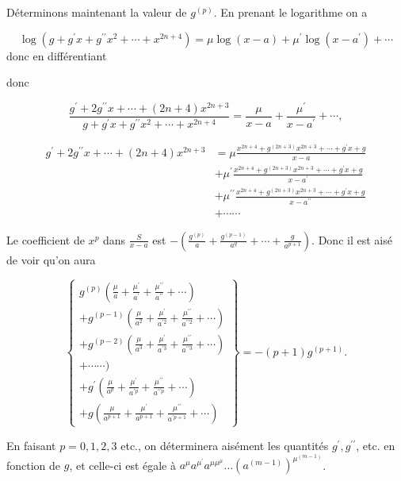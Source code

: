 \documentclass{article}
\begin{document}
Déterminons maintenant la valeur de \(g^{(p)}\). En prenant le logarithme on a

\[
\log \left(g+g^{\prime} x+g^{\prime \prime} x^{2}+\cdots+x^{2 n+4}\right)=\mu \log (x-a)+\mu^{\prime} \log \left(x-a^{\prime}\right)+\cdots
\]
donc en différentiant

donc

\[
\frac{g^{\prime}+2 g^{\prime \prime} x+\cdots+(2 n+4) x^{2 n+3}}{g+g^{\prime} x+g^{\prime \prime} x^{2}+\cdots+x^{2 n+4}}=\frac{\mu}{x-a}+\frac{\mu^{\prime}}{x-a^{\prime}}+\cdots,
\]

\[
\begin{aligned}
g^{\prime}+2 g^{\prime \prime} x+\cdots+(2 n+4) x^{2 n+3} & =\mu \frac{x^{2 n+4}+g^{(2 n+3)} x^{2 n+3}+\cdots+g^{\prime} x+g}{x-a} \\
& +\mu^{\prime} \frac{x^{2 n+4}+g^{(2 n+3)} x^{2 n+3}+\cdots+g^{\prime} x+g}{x-a^{\prime}} \\
& +\mu^{\prime \prime} \frac{x^{2 n+4}+g^{(2 n+3)} x^{2 n+3}+\cdots+g^{\prime} x+g}{x-a^{\prime \prime}} \\
& +\cdots \cdots
\end{aligned}
\]

Le coefficient de \(x^{p}\) dans \(\frac{S}{x-a}\) est \(-\left(\frac{g^{(p)}}{a}+\frac{g^{(p-1)}}{a^{q}}+\cdots+\frac{g}{a^{p+1}}\right)\). Donc il est aisé de voir qu'on aura

\[
\left\{\begin{array}{r}
g^{(p)}\left(\frac{\mu}{a}+\frac{\mu^{\prime}}{a^{\prime}}+\frac{\mu^{\prime \prime}}{a^{\prime \prime}}+\cdots\right) \\
+g^{(p-1)}\left(\frac{\mu}{a^{2}}+\frac{\mu^{\prime}}{a^{\prime 2}}+\frac{\mu^{\prime \prime}}{a^{\prime \prime 2}}+\cdots\right) \\
+g^{(p-2)}\left(\frac{\mu}{a^{3}}+\frac{\mu^{\prime}}{a^{\prime 3}}+\frac{\mu^{\prime \prime}}{a^{\prime \prime 3}}+\cdots\right) \\
+\cdots \cdots) \\
+g^{\prime}\left(\frac{\mu}{a^{p}}+\frac{\mu^{\prime}}{a^{\prime p}}+\frac{\mu^{\prime \prime}}{a^{\prime \prime p}}+\cdots\right) \\
+g\left(\frac{\mu}{a^{p+1}}+\frac{\mu^{\prime}}{a^{p+1}}+\frac{\mu^{\prime \prime}}{a^{\prime p+1}}+\cdots\right)
\end{array}\right\}=-(p+1) g^{(p+1)} .
\]

En faisant \(p=0,1,2,3\) etc., on déterminera aisément les quantités \(g^{\prime}, g^{\prime \prime}\), etc. en fonction de \(g\), et celle-ci est égale à \(a^{\mu} a^{\mu^{\prime}} a^{\mu \mu^{\mu}} \ldots\left(a^{(m-1)}\right)^{\mu^{(m-1)}}\).
\end{document}
